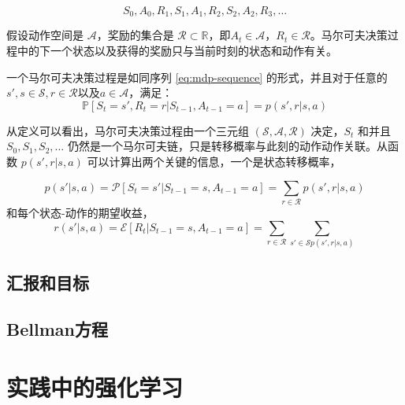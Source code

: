 \begin{equation}
    S_0, A_0, R_1, S_1, A_1, R_2, S_2, A_2, R_3,\dots
    \label{eq:mdp-sequence}
\end{equation}

假设动作空间是 $\mathcal{A}$，奖励的集合是 $\mathcal{R} \subset \mathbb{R}$，即$A_t \in \mathcal{A}$，$R_t \in \mathcal{R}$。马尔可夫决策过程中的下一个状态以及获得的奖励只与当前时刻的状态和动作有关。

\begin{definition}[马尔可夫决策过程]
    一个马尔可夫决策过程是如同序列 \ref{eq:mdp-sequence} 的形式，并且对于任意的$s', s \in \mathcal{S}, r \in \mathcal{R} \text{以及} a\in \mathcal{A}$，满足：
    \begin{equation}
        \mathbb{P}[S_t = s', R_t = r| S_{t-1}, A_{t-1} = a] = p(s', r | s, a)
        \label{def:mdp}
    \end{equation}
\end{definition}

从定义可以看出，马尔可夫决策过程由一个三元组 $(\mathcal{S}, \mathcal{A}, \mathcal{R})$ 决定，$S_t$ 和并且 $S_0, S_1, S_2, \dots$ 仍然是一个马尔可夫链，只是转移概率与此刻的动作动作关联。从函数 $p(s', r|s, a)$ 可以计算出两个关键的信息，一个是状态转移概率，

\begin{equation}
    p(s'|s, a) = \mathcal{P}[S_t = s' | S_{t-1} = s, A_{t-1} = a] = \sum_{r\in \mathcal{R}} p(s', r|s, a)
\end{equation}
和每个状态-动作的期望收益，
\begin{equation}
    r(s' | s, a) = \mathcal{E} [R_t | S_{t-1} = s, A_{t-1} = a] = \sum_{r\in \mathcal{R}} \sum_{s' \in \mathcal{S} p(s', r | s, a)}
\end{equation}


\subsection{汇报和目标}



\subsection{Bellman方程}




\section{实践中的强化学习}


